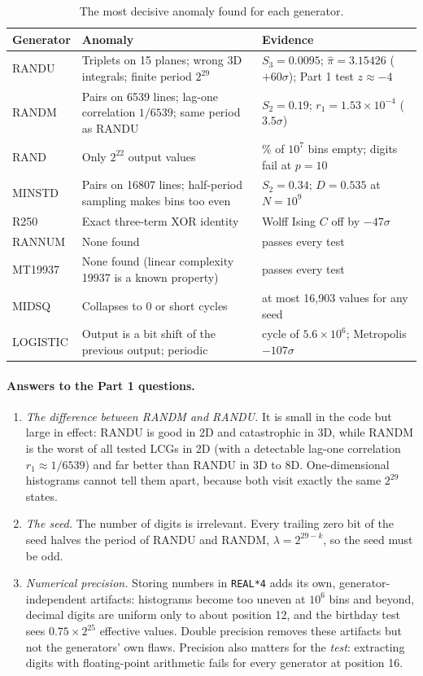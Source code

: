 \documentclass[11pt]{article}
\begin{document}
\begin{table}[htbp]\centering\small
\caption{The most decisive anomaly found for each generator.}\label{tab:summary}
\begin{tabular}{@{}l>{\raggedright}p{6.4cm}>{\raggedright\arraybackslash}p{5.0cm}@{}}
\toprule
Generator & Anomaly & Evidence \\
\midrule
RANDU & Triplets on 15 planes; wrong 3D integrals; finite period $2^{29}$ & $S_3=0.0095$; $\hat\pi=3.15426$ ($+60\sigma$); Part 1 test $z\approx-4$ \\
RANDM & Pairs on 6539 lines; lag-one correlation $1/6539$; same period as RANDU & $S_2=0.19$; $r_1=1.53\times10^{-4}$ ($3.5\sigma$) \\
RAND & Only $2^{22}$ output values & 58\% of $10^7$ bins empty; digits fail at $p=10$ \\
MINSTD & Pairs on 16807 lines; half-period sampling makes bins too even & $S_2=0.34$; $D=0.535$ at $N=10^9$ \\
R250 & Exact three-term XOR identity & Wolff Ising $C$ off by $-47\sigma$ \\
RANNUM & None found & passes every test \\
MT19937 & None found (linear complexity 19937 is a known property) & passes every test \\
MIDSQ & Collapses to 0 or short cycles & at most 16,903 values for any seed \\
LOGISTIC & Output is a bit shift of the previous output; periodic & cycle of $5.6\times10^6$; Metropolis $-107\sigma$ \\
\bottomrule
\end{tabular}
\end{table}

\paragraph{Answers to the Part 1 questions.}
\begin{enumerate}
\item \emph{The difference between RANDM and RANDU.} It is small in the code but large in effect: RANDU is good in 2D and catastrophic in 3D, while RANDM is the worst of all tested LCGs in 2D (with a detectable lag-one correlation $r_1 \approx 1/6539$) and far better than RANDU in 3D to 8D. One-dimensional histograms cannot tell them apart, because both visit exactly the same $2^{29}$ states.
\item \emph{The seed.} The number of digits is irrelevant. Every trailing zero bit of the seed halves the period of RANDU and RANDM, $\lambda = 2^{29-k}$, so the seed must be odd.
\item \emph{Numerical precision.} Storing numbers in \texttt{REAL*4} adds its own, generator-independent artifacts: histograms become too uneven at $10^6$ bins and beyond, decimal digits are uniform only to about position 12, and the birthday test sees $0.75\times2^{25}$ effective values. Double precision removes these artifacts but not the generators' own flaws. Precision also matters for the \emph{test}: extracting digits with floating-point arithmetic fails for every generator at position 16.
\end{enumerate}
\end{document}
